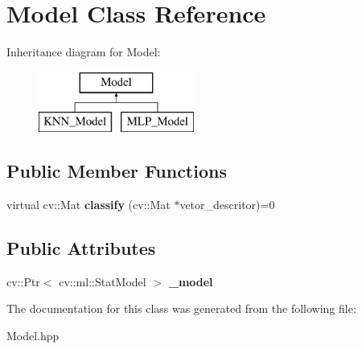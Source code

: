 \hypertarget{class_model}{\section{Model Class Reference}
\label{class_model}
}
Inheritance diagram for Model\+:\begin{figure}[H]
\begin{center}
\leavevmode
\includegraphics[height=2.000000cm]{class_model}
\end{center}
\end{figure}
\subsection*{Public Member Functions}
\begin{DoxyCompactItemize}
\item 
\hypertarget{class_model_ab5799bb1dc24f8251cb7c63c1fa7896b}{virtual cv\+::\+Mat {\bfseries classify} (cv\+::\+Mat $\ast$vetor\+\_\+descritor)=0}\label{class_model_ab5799bb1dc24f8251cb7c63c1fa7896b}

\end{DoxyCompactItemize}
\subsection*{Public Attributes}
\begin{DoxyCompactItemize}
\item 
\hypertarget{class_model_a9fef19ce6fbc31f92e86b5a05cccf65d}{cv\+::\+Ptr$<$ cv\+::ml\+::\+Stat\+Model $>$ {\bfseries \+\_\+model}}\label{class_model_a9fef19ce6fbc31f92e86b5a05cccf65d}

\end{DoxyCompactItemize}


The documentation for this class was generated from the following file\+:\begin{DoxyCompactItemize}
\item 
Model.\+hpp\end{DoxyCompactItemize}
